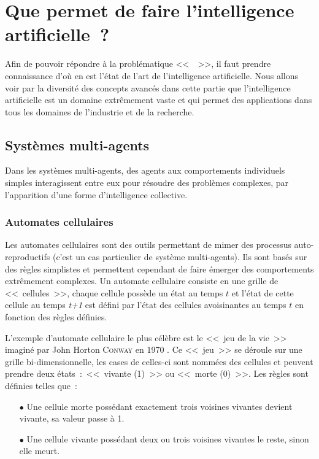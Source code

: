 \section{Que permet de faire l'intelligence artificielle~?}

Afin de pouvoir répondre à la problématique <<~\sujet ~>>, il faut prendre connaissance d'où en est l'état de l'art de l'intelligence artificielle.
Nous allons voir par la diversité des concepts avancés dans cette partie que l'intelligence artificielle est un domaine extrêmement vaste et qui permet des applications dans tous les domaines de l'industrie et de la recherche.

\subsection{Systèmes multi-agents}

Dans les systèmes multi-agents, des agents aux comportements individuels simples interagissent entre eux pour résoudre des problèmes complexes, par l'apparition d'une forme d'intelligence collective.

\subsubsection{Automates cellulaires}

Les automates cellulaires sont des outils permettant de mimer des processus auto-reproductifs (c'est un cas particulier de système multi-agents).
Ils sont basés sur des règles simplistes et permettent cependant de faire émerger des comportements extrêmement complexes.
Un automate cellulaire consiste en une grille de <<~cellules~>>, chaque cellule possède un état au temps $t$ et l'état de cette cellule au temps \textit{t+1} est défini par l'état des cellules avoisinantes au temps $t$ en fonction des règles définies.

L'exemple d'automate cellulaire le plus célèbre est le <<~jeu de la vie~>> imaginé par John Horton \textsc{Conway} en 1970 \cite{conway}.
Ce <<~jeu~>> se déroule sur une grille bi-dimensionnelle, les cases de celles-ci sont nommées des cellules et peuvent prendre deux états~:~<<~vivante (1)~>> ou <<~morte (0)~>>.
Les règles sont définies telles que~:~
\\
\begin{itemize}
    \item[\tiny$\bullet$] Une cellule morte possédant exactement trois voisines vivantes devient vivante, sa valeur passe à 1.
    
    \item[\tiny$\bullet$] Une cellule vivante possédant deux ou trois voisines vivantes le reste, sinon elle meurt.
\end{itemize}
~\\

